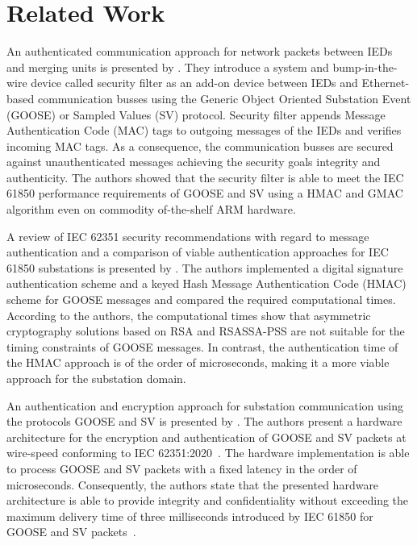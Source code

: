 \chapter{Related Work}
\label{ch:relatedwork}
An authenticated communication approach for network packets between IEDs and merging units is presented by \citeauthor{Ishchenko2018} \cite{Ishchenko2018}.
They introduce a system and bump-in-the-wire device called security filter as an add-on device between IEDs and Ethernet-based communication busses using the Generic Object Oriented Substation Event (GOOSE) or Sampled Values (SV) protocol.
Security filter appends Message Authentication Code (MAC) tags to outgoing messages of the IEDs and verifies incoming MAC tags.
As a consequence, the communication busses are secured against unauthenticated messages achieving the security goals integrity and authenticity.
The authors showed that the security filter is able to meet the IEC 61850 performance requirements of GOOSE and SV \cite{IEC61850P5} using a HMAC and GMAC algorithm even on commodity of-the-shelf ARM hardware.

A review of IEC 62351 security recommendations with regard to message authentication and a comparison of viable authentication approaches for IEC 61850 substations is presented by \citeauthor{Elbez2019} \cite{Elbez2019}.
The authors implemented a digital signature authentication scheme and a keyed Hash Message Authentication Code (HMAC) scheme for GOOSE messages and compared the required computational times.
According to the authors, the computational times show that asymmetric cryptography solutions based on RSA and RSASSA-PSS are not suitable for the timing constraints of GOOSE messages.
In contrast, the authentication time of the HMAC approach is of the order of microseconds, making it a more viable approach for the substation domain.

An authentication and encryption approach for substation communication using the protocols GOOSE and SV is presented by \citeauthor{Rodriguez2021} \cite{Rodriguez2021}.
The authors present a hardware architecture for the encryption and authentication of GOOSE and SV packets at wire-speed conforming to IEC 62351:2020~\cite{IEC62351P6}.
The hardware implementation is able to process GOOSE and SV packets with a fixed latency in the order of microseconds.
Consequently, the authors state that the presented hardware architecture is able to provide integrity and confidentiality without exceeding the maximum delivery time of three milliseconds introduced by IEC 61850 for GOOSE and SV packets~\cite{IEC61850P5}.

